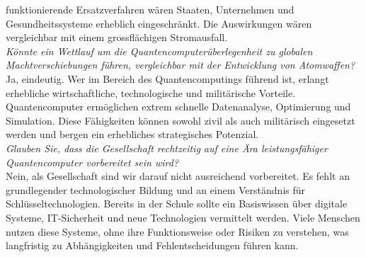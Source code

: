 funktionierende Ersatzverfahren wären Staaten, Unternehmen und Gesundheitssysteme erheblich 
eingeschränkt. Die Auswirkungen wären vergleichbar mit einem grossflächigen Stromausfall.
\vspace{1em}
\\
\textit{Könnte ein Wettlauf um die Quantencomputerüberlegenheit zu globalen Machtverschiebungen führen, 
vergleichbar mit der Entwicklung von Atomwaffen?}\\
Ja, eindeutig. Wer im Bereich des Quantencomputings führend ist, erlangt erhebliche wirtschaftliche, 
technologische und militärische Vorteile. Quantencomputer ermöglichen extrem schnelle Datenanalyse, 
Optimierung und Simulation. Diese Fähigkeiten können sowohl zivil als auch militärisch eingesetzt 
werden und bergen ein erhebliches strategisches Potenzial.
\vspace{1em}
\\
\hypertarget{overall_security}{}\textit{Glauben Sie, dass die Gesellschaft rechtzeitig auf eine Ära leistungsfähiger 
Quantencomputer vorbereitet sein wird?}\\
Nein, als Gesellschaft sind wir darauf nicht ausreichend vorbereitet. Es fehlt an grundlegender 
technologischer Bildung und an einem Verständnis für Schlüsseltechnologien. Bereits in der Schule 
sollte ein Basiswissen über digitale Systeme, IT-Sicherheit und neue Technologien vermittelt werden. 
Viele Menschen nutzen diese Systeme, ohne ihre Funktionsweise oder Risiken zu verstehen, was langfristig 
zu Abhängigkeiten und Fehlentscheidungen führen kann.

